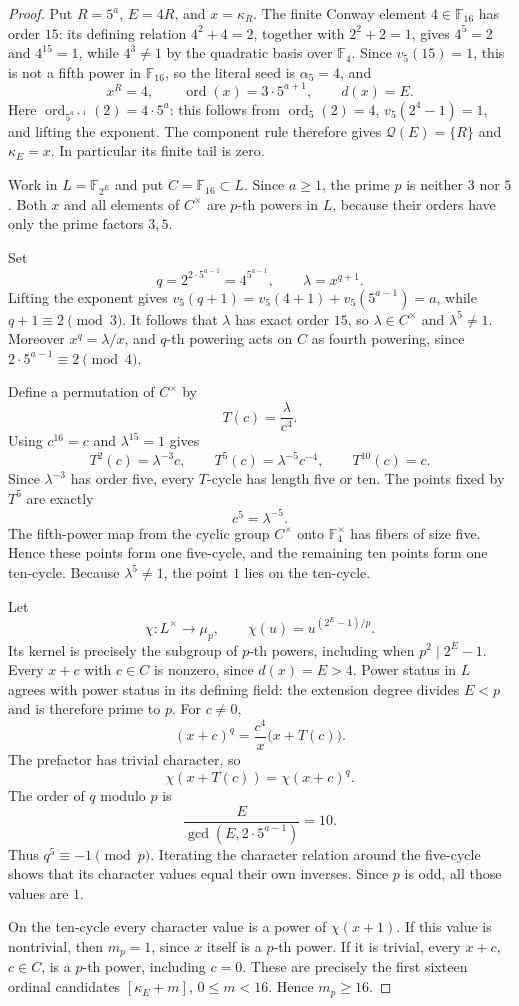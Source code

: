 \documentclass[11pt]{article}
\theoremstyle{definition}
\theoremstyle{remark}
\begin{document}
\begin{proof}
Put $R=5^a$, $E=4R$, and $x=\kappa_R$.  The finite Conway element
$4\in\mathbb F_{16}$ has order $15$: its defining relation
$4^2+4=2$, together with $2^2+2=1$, gives $4^5=2$ and $4^{15}=1$,
while $4^3\ne1$ by the quadratic basis over $\mathbb F_4$.
Since $v_5(15)=1$, this is not a fifth power in $\mathbb F_{16}$,
so the literal seed is $\alpha_5=4$, and
\[
 x^R=4,\qquad \operatorname{ord}(x)=3\cdot5^{a+1},\qquad d(x)=E.
\]
Here $\operatorname{ord}_{5^{a+1}}(2)=4\cdot5^a$: this follows from
$\operatorname{ord}_5(2)=4$, $v_5(2^4-1)=1$, and lifting the exponent.
The component rule therefore gives $\mathcal Q(E)=\{R\}$ and
$\kappa_E=x$.  In particular its finite tail is zero.

Work in $L=\mathbb F_{2^E}$ and put $C=\mathbb F_{16}\subset L$.
Since $a\geq1$, the prime $p$ is neither $3$ nor $5$.  Both $x$ and all
elements of $C^\times$ are $p$-th powers in $L$, because their orders have
only the prime factors $3,5$.

Set
\[
 q=2^{2\cdot5^{a-1}}=4^{5^{a-1}},\qquad \lambda=x^{q+1}.
\]
Lifting the exponent gives
$v_5(q+1)=v_5(4+1)+v_5(5^{a-1})=a$, while $q+1\equiv2\pmod3$.
It follows that $\lambda$ has exact order $15$, so
$\lambda\in C^\times$ and $\lambda^5\ne1$.
Moreover $x^q=\lambda/x$, and $q$-th powering acts on $C$ as fourth
powering, since $2\cdot5^{a-1}\equiv2\pmod4$.

Define a permutation of $C^\times$ by
\[
 T(c)=\frac{\lambda}{c^4}.
\]
Using $c^{16}=c$ and $\lambda^{15}=1$ gives
\[
 T^2(c)=\lambda^{-3}c,\qquad
 T^5(c)=\lambda^{-5}c^{-4},\qquad T^{10}(c)=c.
\]
Since $\lambda^{-3}$ has order five, every $T$-cycle has length five or
ten.  The points fixed by $T^5$ are exactly
\[
 c^5=\lambda^{-5}.
\]
The fifth-power map from the cyclic group $C^\times$ onto
$\mathbb F_4^\times$ has fibers of size five.  Hence these points form
one five-cycle, and the remaining ten points form one ten-cycle.
Because $\lambda^5\ne1$, the point $1$ lies on the ten-cycle.

Let
\[
 \chi:L^\times\longrightarrow\mu_p,
 \qquad \chi(u)=u^{(2^E-1)/p}.
\]
Its kernel is precisely the subgroup of $p$-th powers, including when
$p^2\mid2^E-1$.  Every $x+c$ with $c\in C$ is nonzero, since
$d(x)=E>4$.  Power status in $L$ agrees with power status in its
defining field: the extension degree divides $E<p$ and is therefore
prime to $p$.  For $c\ne0$,
\[
 (x+c)^q=\frac{c^4}{x}\bigl(x+T(c)\bigr).
\]
The prefactor has trivial character, so
\[
 \chi(x+T(c))=\chi(x+c)^q.
\]
The order of $q$ modulo $p$ is
\[
 \frac{E}{\gcd(E,2\cdot5^{a-1})}=10.
\]
Thus $q^5\equiv-1\pmod p$.  Iterating
the character relation around the five-cycle shows that its
character values equal their own inverses.  Since $p$ is odd, all those
values are $1$.

On the ten-cycle every character value is a power of $\chi(x+1)$.
If this value is nontrivial, then $m_p=1$, since $x$ itself is a
$p$-th power.  If it is trivial, every $x+c$, $c\in C$, is a
$p$-th power, including $c=0$.  These are precisely the first sixteen
ordinal candidates $[\kappa_E+m]$, $0\leq m<16$.  Hence $m_p\geq16$.
\end{proof}
\end{document}
